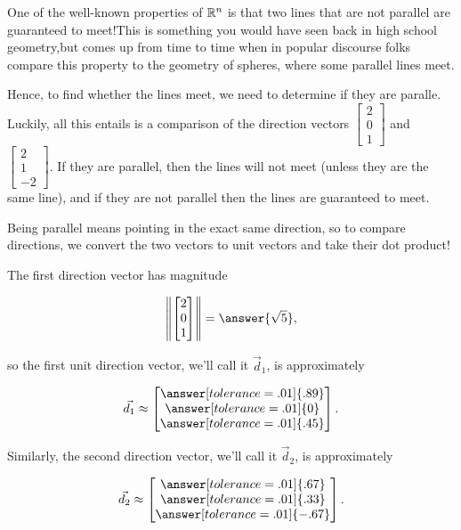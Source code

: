 \documentclass{ximera}
\begin{document}
\begin{solution}
  One of the well-known properties of $\mathbb{R}^n$ is that two lines that are not parallel are guaranteed to meet!This is something you would have seen back in high school geometry,but comes up from time to time when in popular discourse folks compare this property to the geometry of spheres, where some parallel lines meet.

  Hence, to find whether the lines meet, we need to determine if they are paralle. Luckily, all this entails is a comparison of the direction vectors $\begin{bmatrix} 2 \\ 0 \\ 1 \end{bmatrix}$ and $\begin{bmatrix} 2 \\ 1 \\ -2 \end{bmatrix}$. If they are parallel, then the lines will not meet (unless they are the same line), and if they are not parallel then the lines are guaranteed to meet.

  Being parallel means pointing in the exact same direction, so to compare directions, we convert the two vectors to unit vectors and take their dot product!

  The first direction vector has magnitude 
  
  $$\norm{\begin{bmatrix} 2 \\ 0 \\ 1 \end{bmatrix}}=\answer{\sqrt{5}},$$
  
  so the first unit direction vector, we'll call it $\vec{d}_1$, is approximately 

  $$\vec{d_1}\approx\begin{bmatrix}
    \answer[tolerance=.01]{.89}\\\answer[tolerance=.01]{0}\\\answer[tolerance=.01]{.45}
  \end{bmatrix}.$$

  Similarly, the second direction vector, we'll call it $\vec{d}_2$, is approximately

  $$\vec{d_2}\approx\begin{bmatrix}
    \answer[tolerance=.01]{.67}\\\answer[tolerance=.01]{.33}\\\answer[tolerance=.01]{-.67}
  \end{bmatrix}.$$  


\end{solution}
\end{document}
